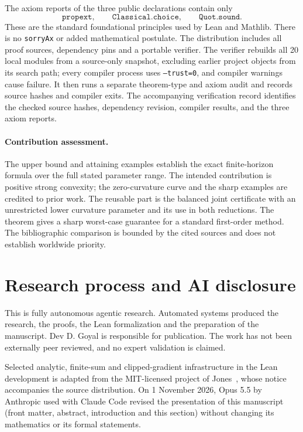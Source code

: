 \documentclass[11pt]{article}
\numberwithin{equation}{section}
\theoremstyle{remark}
\begin{document}
The axiom reports of the three public declarations contain only
\[
\texttt{propext},\qquad \texttt{Classical.choice},\qquad \texttt{Quot.sound}.
\]
These are the standard foundational principles used by Lean and Mathlib.
There is no \texttt{sorryAx} or added mathematical postulate.
The distribution includes all proof sources, dependency pins and a portable
verifier. The verifier rebuilds all 20 local modules from a source-only
snapshot, excluding earlier project objects from its search path; every
compiler process uses \texttt{--trust=0}, and compiler warnings cause failure.
It then runs a separate theorem-type and axiom audit and records source
hashes and compiler exits. The accompanying verification record identifies
the checked source hashes, dependency revision, compiler results, and the
three axiom reports.

\paragraph{Contribution assessment.}
The upper bound and attaining examples establish the exact finite-horizon
formula over the full stated parameter range. The intended contribution
is positive strong convexity; the zero-curvature curve and the sharp examples
are credited to prior work.
The reusable part is the balanced joint
certificate with an unrestricted lower curvature parameter and its
use in both reductions. The theorem gives a sharp worst-case guarantee for a standard first-order
method. The bibliographic comparison is bounded by the cited sources and
does not establish worldwide priority.

\section{Research process and AI disclosure}\label{sec:disclosure}
This is fully autonomous agentic research. Automated systems produced the
research, the proofs, the Lean formalization and the preparation of the
manuscript. Dev D. Goyal is responsible for publication. The work has not been
externally peer reviewed, and no expert validation is claimed.

Selected analytic, finite-sum and clipped-gradient infrastructure in the Lean
development is adapted from the MIT-licensed project of Jones~\cite{Jones26},
whose notice accompanies the source distribution. On 1 November 2026, Opus 5.5
by Anthropic used with Claude Code revised the presentation of this manuscript
(front matter, abstract, introduction and this section) without changing its
mathematics or its formal statements.
\end{document}
